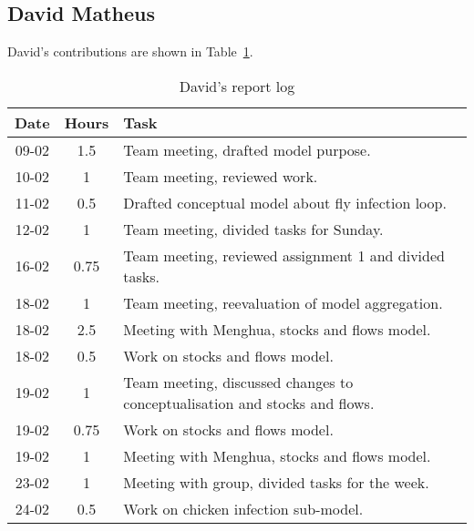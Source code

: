 
\subsection{David Matheus}
David's contributions are shown in Table~\ref{tab:david_log}. 
\begin{longtable}[c]{c|c|m{35em}}
\caption{David's report log}
\label{tab:david_log}\\
\textbf{Date}& \textbf{Hours} & \textbf{Task} \\
\hline
\endfirsthead
%
\endhead
%
09-02   &   1.5     &   Team meeting, drafted model purpose.                                         \\
10-02   &   1       &   Team meeting, reviewed work.                                                 \\
11-02   &   0.5     &   Drafted conceptual model about fly infection loop.                           \\
12-02   &   1       &   Team meeting, divided tasks for Sunday.                                      \\
16-02   &   0.75    &   Team meeting, reviewed assignment 1 and divided tasks.                       \\
18-02   &   1       &   Team meeting, reevaluation of model aggregation.                             \\
18-02   &   2.5     &   Meeting with Menghua, stocks and flows model.                                \\
18-02   &   0.5     &   Work on stocks and flows model.                                              \\
19-02   &   1       &   Team meeting, discussed changes to conceptualisation and stocks and flows.   \\
19-02   &   0.75    &   Work on stocks and flows model.                                              \\
19-02   &   1       &   Meeting with Menghua, stocks and flows model.                                \\
23-02   &   1       &   Meeting with group, divided tasks for the week.                              \\
24-02   &   0.5     &   Work on chicken infection sub-model.                                         \\

\end{longtable}
